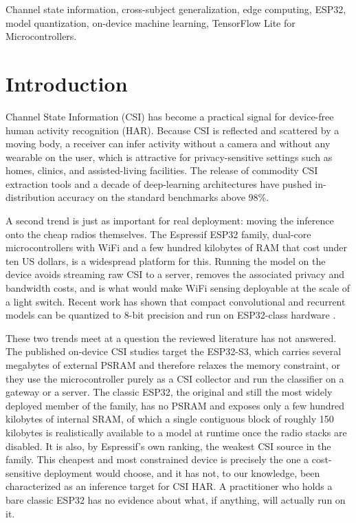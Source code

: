 \documentclass{ieeeaccess}
\begin{document}
\begin{keywords}
Channel state information, cross-subject generalization, edge computing, ESP32, model quantization, on-device machine learning, TensorFlow Lite for Microcontrollers.
\end{keywords}

\titlepgskip=-15pt

\maketitle
\section{Introduction}
\label{sec:introduction}
 Channel State Information (CSI) has become a practical signal for device-free human activity recognition (HAR). Because CSI is reflected and scattered by a moving body, a receiver can infer activity without a camera and without any wearable on the user, which is attractive for privacy-sensitive settings such as homes, clinics, and assisted-living facilities. The release of commodity CSI extraction tools \cite{halperin2011csi} and a decade of deep-learning architectures \cite{ma2019wifi,yang2023sensefi} have pushed in-distribution accuracy on the standard benchmarks above 98\%.

A second trend is just as important for real deployment: moving the inference onto the cheap radios themselves. The Espressif ESP32 family, dual-core microcontrollers with WiFi and a few hundred kilobytes of RAM that cost under ten US dollars, is a widespread platform for this. Running the model on the device avoids streaming raw CSI to a server, removes the associated privacy and bandwidth costs, and is what would make WiFi sensing deployable at the scale of a light switch. Recent work has shown that compact convolutional and recurrent models can be quantized to 8-bit precision and run on ESP32-class hardware \cite{hernandez2025tools,espfihar2026}.

These two trends meet at a question the reviewed literature has not answered. The published on-device CSI studies target the ESP32-S3, which carries several megabytes of external PSRAM and therefore relaxes the memory constraint, or they use the microcontroller purely as a CSI collector and run the classifier on a gateway or a server. The classic ESP32, the original and still the most widely deployed member of the family, has no PSRAM and exposes only a few hundred kilobytes of internal SRAM, of which a single contiguous block of roughly 150 kilobytes is realistically available to a model at runtime once the radio stacks are disabled. It is also, by Espressif's own ranking, the weakest CSI source in the family. This cheapest and most constrained device is precisely the one a cost-sensitive deployment would choose, and it has not, to our knowledge, been characterized as an inference target for CSI HAR. A practitioner who holds a bare classic ESP32 has no evidence about what, if anything, will actually run on it.
\end{document}
